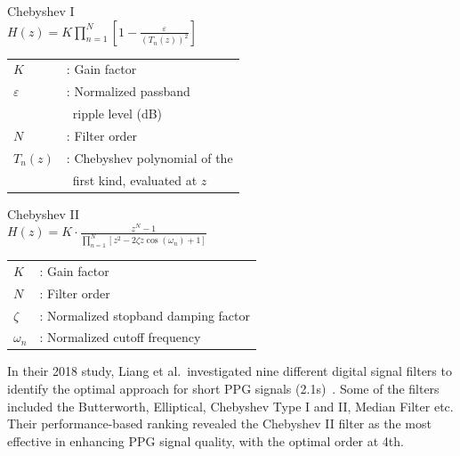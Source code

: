 \begin{multicols}{2}
    \begin{center}
        Chebyshev I \\
        \vspace{0.2cm}
        \large
        \begin{math}
            H(z) = K \prod_{n=1}^{N} \left[ 1 - \frac{\varepsilon}{(T_n(z))^2} \right]
        \end{math}
        \normalsize
        \begin{tabular}{ll}
            $K$           & : Gain factor                 \\
            $\varepsilon$ & : Normalized passband         \\           & \;\, ripple level (dB)                \\
            $N$      & : Filter order \\
            $T_n(z)$      & : Chebyshev polynomial of the \\      & \;\, first kind, evaluated at $z$ \\
        \end{tabular}
    \end{center}
    \columnbreak
    \begin{center}
        Chebyshev II \\
        \vspace{0.2cm}
        \large
        \begin{math}
            H(z) = K \cdot \frac{z^N - 1}{\prod_{n=1}^{N} \left[ z^2 - 2 \zeta z \cos(\omega_n) + 1 \right]}
        \end{math}
        \normalsize
        \begin{tabular}{ll}
            $K$        & : Gain factor                        \\
            $N$        & : Filter order                       \\
            $\zeta$    & : Normalized stopband damping factor \\
            $\omega_n$ & : Normalized cutoff frequency        \\
        \end{tabular}
    \end{center}
\end{multicols}

In their 2018 study, Liang et al.\ investigated nine different digital signal filters to identify the optimal approach for short PPG signals (2.1s)~\cite{liangOptimalFilterShort2018}.
Some of the filters included the Butterworth, Elliptical, Chebyshev Type I and II, Median Filter etc.
Their performance-based ranking revealed the Chebyshev II filter as the most effective in enhancing PPG signal quality, with the optimal order at 4th.

